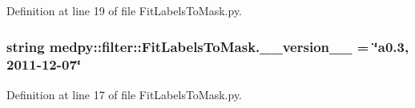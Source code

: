 Definition at line 19 of file FitLabelsToMask.py.

\hypertarget{namespacemedpy_1_1filter_1_1FitLabelsToMask_a9b5e0789e1a56f91bbe74397bd9563c8}{
\subsubsection[{\_\-\_\-version\_\-\_\-}]{\setlength{\rightskip}{0pt plus 5cm}string {\bf medpy::filter::FitLabelsToMask.\_\-\_\-version\_\-\_\-} = \char`\"{}a0.3, 2011-\/12-\/07\char`\"{}}}
\label{namespacemedpy_1_1filter_1_1FitLabelsToMask_a9b5e0789e1a56f91bbe74397bd9563c8}


Definition at line 17 of file FitLabelsToMask.py.

